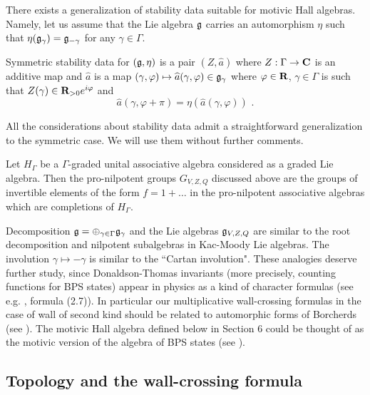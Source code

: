 \documentclass[12pt]{article}
\begin{document}
There exists a generalization of stability data suitable for motivic Hall algebras. Namely, let us assume that
the Lie algebra ${\mathfrak g}$ carries an automorphism $\eta$ such that $\eta({\mathfrak g}_{\gamma})={\mathfrak g}_{-\gamma}$
for any $\gamma\in \Gamma$.

\begin{defn} Symmetric stability data for $({\mathfrak g},\eta)$ is a pair
$(Z,\widehat{a})$ where $Z:\Gamma\to {\bf C}$ is an additive map
and $\widehat{a}$ is a map $(\gamma,\varphi)\mapsto\widehat{a}(\gamma,\varphi)\in {\mathfrak g}_{\gamma}$ where
$\varphi \in {\bf R}$,
$\gamma\in \Gamma$ is such that $Z(\gamma)\in {\bf R}_{>0}e^{i\varphi}$ and
$$\widehat{a}(\gamma,\varphi+\pi)=\eta(\widehat{a}(\gamma,\varphi))\,\,.$$

\end{defn}

All the considerations about stability data admit a straightforward generalization to the symmetric case.
We will use them without further comments.


\begin{rmk} Let $H_{\Gamma}$ be a $\Gamma$-graded unital associative algebra considered as a graded Lie algebra.
Then the pro-nilpotent groups $G_{V,Z,Q}$ discussed above are the groups of invertible elements of the form $f=1+\dots$
in the pro-nilpotent associative algebras which are completions of $H_{\Gamma}$.


\end{rmk}



\begin{rmk} Decomposition ${\mathfrak g}=\oplus_{\gamma\in \Gamma}{\mathfrak g}_{\gamma}$ and the Lie algebras ${\mathfrak g}_{V,Z,Q}$ are similar to the root decomposition and nilpotent subalgebras in Kac-Moody Lie algebras.
The involution $\gamma\mapsto -\gamma$ is similar to the ``Cartan involution".
 These analogies deserve further study, since Donaldson-Thomas invariants (more precisely, counting functions for BPS states) appear in physics as
a kind of character formulas (see e.g. \cite{DiM}, formula (2.7)). In particular our multiplicative wall-crossing formulas in the case of wall of second kind should be related
to automorphic forms of Borcherds (see \cite{Bor}). The motivic Hall algebra defined below in Section 6 could be thought  of as the motivic version of the algebra of BPS states (see \cite{HM}).


\end{rmk}



\subsection{Topology and the wall-crossing formula}
\end{document}
